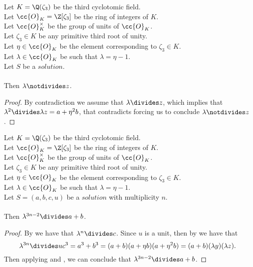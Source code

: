 \begin{lemma}
  \label{lmm:lambda_not_dvd_z}
  \leanok
  Let $K = \Q(\zeta_3)$ be the third cyclotomic field. \\
  Let $\cc{O}_K = \Z[\zeta_3]$ be the ring of integers of $K$. \\
  Let $\cc{O}^\times_K$ be the group of units of $\cc{O}_K$. \\
  Let $\zeta_3 \in K$ be any primitive third root of unity. \\
  Let $\eta \in \cc{O}_K$ be the element corresponding to $\zeta_3 \in K$. \\
  Let $\lambda \in \cc{O}_K$ be such that $\lambda = \eta -1$. \\
  Let $S$ be a $solution$.\\\\
  Then $\lambda \notdivides z$.
\end{lemma}
\begin{proof}
  \leanok
  By contradiction we assume that $\lambda \divides z$, which implies that
  $\lambda^2 \divides \lambda z = a + \eta^2 b$, that contradicts
   forcing us to conclude $\lambda \notdivides z$.
\end{proof}

\begin{lemma}
  \label{lmm:lambda_pow_dvd_a_add_b}
  \leanok
  Let $K = \Q(\zeta_3)$ be the third cyclotomic field. \\
  Let $\cc{O}_K = \Z[\zeta_3]$ be the ring of integers of $K$. \\
  Let $\cc{O}^\times_K$ be the group of units of $\cc{O}_K$. \\
  Let $\zeta_3 \in K$ be any primitive third root of unity. \\
  Let $\eta \in \cc{O}_K$ be the element corresponding to $\zeta_3 \in K$. \\
  Let $\lambda \in \cc{O}_K$ be such that $\lambda = \eta -1$. \\
  Let $S=(a, b, c, u)$ be a $solution$ with multiplicity $n$.\\\\
  Then $\lambda^{3n -2} \divides a + b$.
\end{lemma}
\begin{proof}
  \leanok
  By  we have that $\lambda^n \divides c$.
  Since $u$ is a unit, then by  we have that
  $$\lambda^{3n} \divides u  c^3 = a^3 + b^3 = (a+b)(a + \eta b)(a + \eta^2 b)
  = (a+b)(\lambda y)(\lambda z).$$
  Then applying  and , we can conclude
  that $\lambda^{3n-2} \divides a+b$.
\end{proof}

